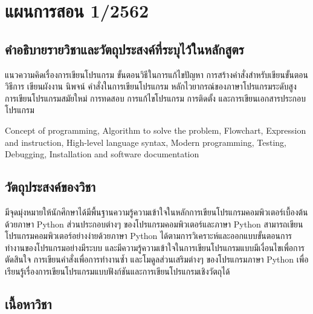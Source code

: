 \chapter{แผนการสอน 1/2562}
\section*{คำอธิบายรายวิชาและวัตถุประสงค์ที่ระบุไว้ในหลักสูตร}


\begin{tcolorbox}[breakable,enhanced,fonttitle=\bfseries,colback=myblue!05,colframe=myblue]
แนวความคิดเรื่องการเขียนโปรแกรม ขั้นตอนวิธีในการแก้ไขปัญหา การสร้างคำสั่งสำหรับเขียนขั้นตอนวิธีการ เขียนผังงาน นิพจน์ คำสั่งในการเขียนโปรแกรม หลักไวยากรณ์ของภาษาโปรแกรมระดับสูง การเขียนโปรแกรมสมัยใหม่ การทดสอบ การแก้ไขโปรแกรม การติดตั้ง และการเขียนเอกสารประกอบโปรแกรม

Concept of programming, Algorithm to solve the problem, Flowchart, Expression and instruction, High-level language syntax, Modern programming, Testing, Debugging, Installation and software documentation
\end{tcolorbox}

\section*{วัตถุประสงค์ของวิชา}

\begin{tcolorbox}[breakable,enhanced,fonttitle=\bfseries,colback=myblue!05,colframe=myblue]
มีจุดมุ่งหมายให้นักศึกษาได้มีพื้นฐานความรู้ความเข้าใจในหลักการเขียนโปรแกรมคอมพิวเตอร์เบื้องต้นด้วยภาษา Python ส่วนประกอบต่างๆ ของโปรแกรมคอมพิวเตอร์และภาษา Python สามารถเขียนโปรแกรมคอมพิวเตอร์อย่างง่ายด้วยภาษา Python ได้ตามการวิเคราะห์และออกแบบขั้นตอนการทำงานของโปรแกรมอย่างมีระบบ และมีความรู้ความเข้าใจในการเขียนโปรแกรมแบบมีเงื่อนไขเพื่อการตัดสินใจ การเขียนคำสั่งเพื่อการทำงานซ้ำ และโมดูลส่วนเสริมต่างๆ ของโปรแกรมภาษา Python เพื่อเรียนรู้เรื่องการเขียนโปรแกรมแบบฟังก์ชันและการเขียนโปรแกรมเชิงวัตถุได้
\end{tcolorbox}
\vspace{1.5cm}

\section*{เนื้อหาวิชา}


